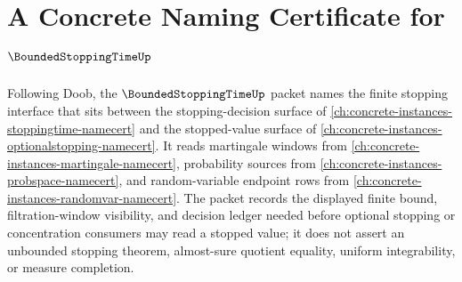 \chapter{A Concrete Naming Certificate for $\BoundedStoppingTimeUp$}
\label{ch:concrete-instances-bounded-stopping-time-namecert}

Following Doob, the $\BoundedStoppingTimeUp$ packet names the finite stopping interface that sits between the stopping-decision surface of \autoref{ch:concrete-instances-stoppingtime-namecert} and the stopped-value surface of \autoref{ch:concrete-instances-optionalstopping-namecert}. It reads martingale windows from \autoref{ch:concrete-instances-martingale-namecert}, probability sources from \autoref{ch:concrete-instances-probspace-namecert}, and random-variable endpoint rows from \autoref{ch:concrete-instances-randomvar-namecert}. The packet records the displayed finite bound, filtration-window visibility, and decision ledger needed before optional stopping or concentration consumers may read a stopped value; it does not assert an unbounded stopping theorem, almost-sure quotient equality, uniform integrability, or measure completion.

